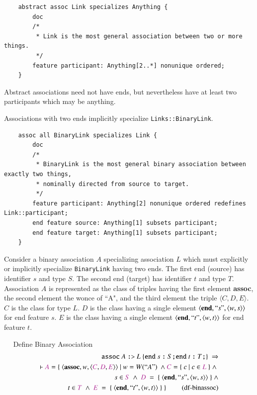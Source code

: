 \begin{lstlisting}
    abstract assoc Link specializes Anything {
        doc
        /*
         * Link is the most general association between two or more things.
         */
        feature participant: Anything[2..*] nonunique ordered;
    }
\end{lstlisting}

\pn Abstract associations need not have ends, but nevertheless have at least two participants which may be anything.

\pn Associations with two ends implicitly specialize \texttt{Links::BinaryLink}.

\begin{lstlisting}
    assoc all BinaryLink specializes Link {
        doc
        /*
         * BinaryLink is the most general binary association between exactly two things, 
         * nominally directed from source to target.
         */       
        feature participant: Anything[2] nonunique ordered redefines Link::participant;   
        end feature source: Anything[1] subsets participant;
        end feature target: Anything[1] subsets participant;
    }
\end{lstlisting}

\pn Consider a binary association $A$ specializing association $L$ which must explicitly or implicitly specialize \texttt{BinaryLink} having two ends.
The first end (source) has identifier $s$ and type $S$.  The second end (target) has identifier $t$ and type $T$.  Association $A$ is represented as the class of triples having the first element \textbf{assoc}, the second element the wonce of ``A", and the third element the triple $\langle C,D,E\rangle$.
$C$ is the class for type $L$.  $D$ is the class having a single element $\langle\textbf{end},``s",\langle w,s \rangle\rangle$ for end feature $s$.
 $E$ is the class having a single element $\langle\textbf{end},``t",\langle w,t \rangle\rangle$ for end feature $t$.

\begin{definition}~~   Define Binary Association
\begin{align}
\texttt{assoc}~ A~\texttt{:>}~L~\{ \texttt{end}~ s ~\texttt{:}~ S\texttt{;} \texttt{end}~ t ~\texttt{:}~ T\texttt{;} \}~\Rightarrow  \notag \\
\vdash \mc{A} = \{~\langle \textbf{assoc},w,\langle  \mc{C}, \mc{D}, \mc{E}\rangle\rangle ~\vert~
w=W(``A")~ \wedge 
 \mc{C}=\{~c~\vert ~c \in  \mc{L}~\}~\wedge~\notag \\
~s\in  \mc{S}~\wedge~ \mc{D}~=~\{~\langle\textbf{end},``s",\langle w,s \rangle\rangle~\}~\wedge \notag \\
~t\in  \mc{T}~\wedge~ \mc{E}~=~\{~\langle\textbf{end},``t",\langle w,t \rangle\rangle~\}~\}~\label{eq:df-binassoc}\tag{df-binassoc}
\end{align}
\end{definition}

